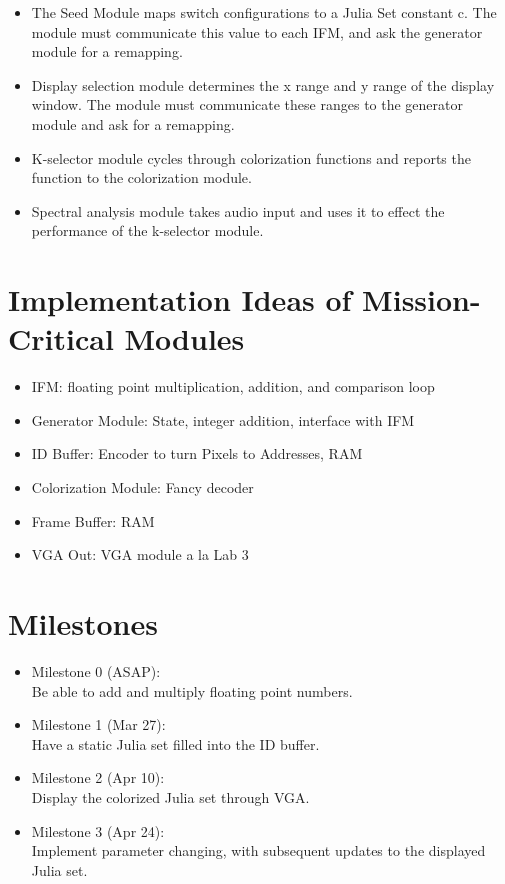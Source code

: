 \documentclass{article}
\begin{document}
\begin{itemize}
\item The Seed Module maps switch configurations to a Julia Set
  constant c. The module must communicate this value to each IFM, and
  ask the generator module for a remapping.
\item Display selection module determines the x range and y range of
  the display window.  The module must communicate these ranges to the
  generator module and ask for a remapping.
\item K-selector module cycles through colorization functions and
  reports the function to the colorization module.
\item Spectral analysis module takes audio input and uses it to effect
  the performance of the k-selector module.
\end{itemize}

\section{Implementation Ideas of Mission-Critical Modules}

\begin{itemize}
\item IFM: floating point multiplication, addition, and comparison loop
\item Generator Module: State, integer addition, interface with IFM
\item ID Buffer: Encoder to turn Pixels to Addresses, RAM
\item Colorization Module: Fancy decoder
\item Frame Buffer: RAM
\item VGA Out: VGA module a la Lab 3
\end{itemize}

\section{Milestones}

\begin{itemize}
\item Milestone 0 (ASAP): \\
  Be able to add and multiply floating point numbers.
\item Milestone 1 (Mar 27): \\
  Have a static Julia set filled into the ID buffer.
\item Milestone 2 (Apr 10): \\
  Display the colorized Julia set through VGA.
\item Milestone 3 (Apr 24): \\
  Implement parameter changing, with
  subsequent updates to the displayed Julia set.
\end{itemize}
\end{document}
